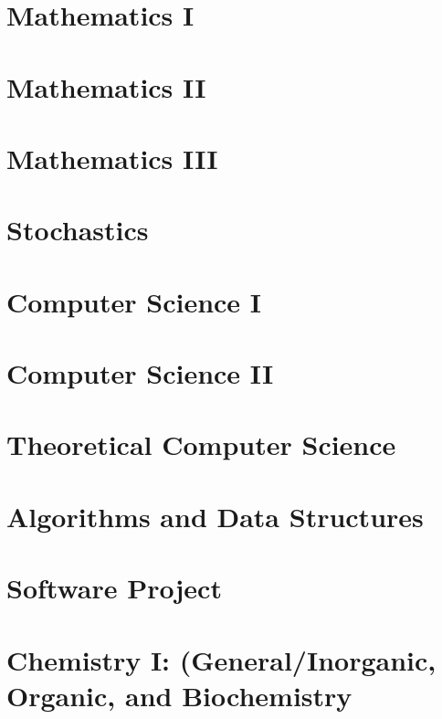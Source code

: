 \chapter{Mathematics I}


\chapter{Mathematics II}


\chapter{Mathematics III}


\chapter{Stochastics}


\chapter{Computer Science I}


\chapter{Computer Science II}


\chapter{Theoretical Computer Science}


\chapter{Algorithms and Data Structures}


\chapter{Software Project}


\chapter{Chemistry I: (General/Inorganic, Organic, and Biochemistry}


